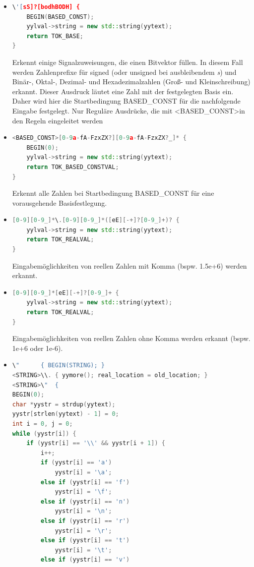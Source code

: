 \documentclass[11pt]{report}
\begin{document}
\begin{itemize}
\item
\begin{lstlisting}[language=C++]
\'[sS]?[bodhBODH] {
	BEGIN(BASED_CONST);
	yylval->string = new std::string(yytext);
	return TOK_BASE;
}
\end{lstlisting}
Erkennt einige Signalzuweisungen, die einen Bitvektor füllen. In diesem Fall werden Zahlenprefixe für signed (oder unsigned bei ausbleibendem \textit{s}) und Binär-, Oktal-, Dezimal- und Hexadezimalzahlen (Groß- und Kleinschreibung) erkannt. Dieser Ausdruck läutet eine Zahl mit der festgelegten Basis ein. Daher wird hier die Startbedingung BASED\_CONST für die nachfolgende Eingabe festgelegt. Nur Reguläre Ausdrücke, die mit \textless BASED\_CONST\textgreater in den Regeln eingeleitet werden
\item
\begin{lstlisting}[language=C++]
<BASED_CONST>[0-9a-fA-FzxZX?][0-9a-fA-FzxZX?_]* {
	BEGIN(0);
	yylval->string = new std::string(yytext);
	return TOK_BASED_CONSTVAL;
}
\end{lstlisting}
Erkennt alle Zahlen bei Startbedingung BASED\_CONST für eine vorausgehende Basisfestlegung.
\item
\begin{lstlisting}[language=C++]
[0-9][0-9_]*\.[0-9][0-9_]*([eE][-+]?[0-9_]+)? {
	yylval->string = new std::string(yytext);
	return TOK_REALVAL;
}
\end{lstlisting}
Eingabemöglichkeiten von reellen Zahlen mit Komma (bspw. 1.5e+6) werden erkannt.
\item
\begin{lstlisting}[language=C++]
[0-9][0-9_]*[eE][-+]?[0-9_]+ {
	yylval->string = new std::string(yytext);
	return TOK_REALVAL;
}
\end{lstlisting}
Eingabemöglichkeiten von reellen Zahlen ohne Komma werden erkannt (bspw. 1e+6 oder 1e-6).
\item
\begin{lstlisting}[language=C++]
\"		{ BEGIN(STRING); }
<STRING>\\.	{ yymore(); real_location = old_location; }
<STRING>\"	{
BEGIN(0);
char *yystr = strdup(yytext);
yystr[strlen(yytext) - 1] = 0;
int i = 0, j = 0;
while (yystr[i]) {
	if (yystr[i] == '\\' && yystr[i + 1]) {
		i++;
		if (yystr[i] == 'a')
			yystr[i] = '\a';
		else if (yystr[i] == 'f')
			yystr[i] = '\f';
		else if (yystr[i] == 'n')
			yystr[i] = '\n';
		else if (yystr[i] == 'r')
			yystr[i] = '\r';
		else if (yystr[i] == 't')
			yystr[i] = '\t';
		else if (yystr[i] == 'v')

\end{lstlisting}
\end{itemize}
\end{document}
